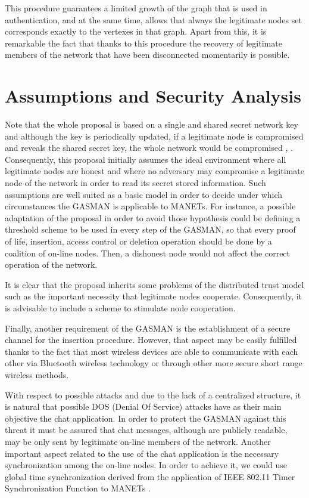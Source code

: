 \documentclass{article}
\begin{document}
This procedure guarantees a limited growth of the graph that
is used in authentication, and at the same time, allows that
always the legitimate nodes set corresponds exactly to the
vertexes in that graph. Apart from this, it is remarkable the fact
that thanks to this procedure  the recovery of legitimate members
of the network that have been disconnected momentarily is possible.

\section{Assumptions and Security Analysis}
\label{AssumptionsasnSecurity}
Note that the whole proposal is based on a single and shared secret network key and although the key is periodically updated, if a legitimate node is compromised and reveals the shared secret key, the whole network would be compromised \cite{HHFSL04}, \cite{Gene07}. Consequently, this proposal initially assumes the ideal environment where all
legitimate nodes are honest and where no adversary may compromise
a legitimate node of the network in order to read its secret
stored information. Such assumptions are well suited as a basic
model in order to decide under which circumstances the GASMAN is applicable to MANETs. For instance, a possible adaptation of the proposal in order to avoid those
hypothesis could be defining a threshold scheme to be used in every step of the GASMAN, so that every proof of life, insertion, access control or deletion operation should be done by a coalition of on-line nodes. Then, a dishonest node would not affect
the correct operation of the network.

It is clear that the proposal inherits some problems of the distributed trust model such as the important necessity that legitimate nodes cooperate. Consequently, it is advisable to include a scheme to stimulate node cooperation.

Finally, another requirement of the GASMAN is the establishment of a secure channel for the insertion procedure. However, that aspect may be easily fulfilled thanks to the fact
that most wireless devices are able to communicate with each other via Bluetooth wireless technology or through other more secure short range wireless methods.

With respect to possible attacks and due to the lack of a centralized
structure, it is natural that possible DOS (Denial Of Service)
attacks have as their main objective the chat application. In
order to protect the GASMAN against this threat it must be assured
that chat messages, although are publicly readable, may be only
sent by legitimate on-line members of the network. Another
important aspect related to the use of the chat application is the
necessary synchronization among the on-line nodes. In order to achieve it, we could use global time synchronization derived from the application of IEEE 802.11 Timer Synchronization Function to MANETs \cite{XGPM07}.  
\end{document}
